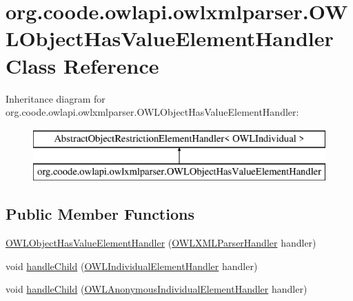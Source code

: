 \hypertarget{classorg_1_1coode_1_1owlapi_1_1owlxmlparser_1_1_o_w_l_object_has_value_element_handler}{\section{org.\-coode.\-owlapi.\-owlxmlparser.\-O\-W\-L\-Object\-Has\-Value\-Element\-Handler Class Reference}
\label{classorg_1_1coode_1_1owlapi_1_1owlxmlparser_1_1_o_w_l_object_has_value_element_handler}
}
Inheritance diagram for org.\-coode.\-owlapi.\-owlxmlparser.\-O\-W\-L\-Object\-Has\-Value\-Element\-Handler\-:\begin{figure}[H]
\begin{center}
\leavevmode
\includegraphics[height=2.000000cm]{classorg_1_1coode_1_1owlapi_1_1owlxmlparser_1_1_o_w_l_object_has_value_element_handler}
\end{center}
\end{figure}
\subsection*{Public Member Functions}
\begin{DoxyCompactItemize}
\item 
\hyperlink{classorg_1_1coode_1_1owlapi_1_1owlxmlparser_1_1_o_w_l_object_has_value_element_handler_ac637e8775b49bdc0d0437339fa5f76ab}{O\-W\-L\-Object\-Has\-Value\-Element\-Handler} (\hyperlink{classorg_1_1coode_1_1owlapi_1_1owlxmlparser_1_1_o_w_l_x_m_l_parser_handler}{O\-W\-L\-X\-M\-L\-Parser\-Handler} handler)
\item 
void \hyperlink{classorg_1_1coode_1_1owlapi_1_1owlxmlparser_1_1_o_w_l_object_has_value_element_handler_a5aaa1bacb7c3083c89271b36bfc2de14}{handle\-Child} (\hyperlink{classorg_1_1coode_1_1owlapi_1_1owlxmlparser_1_1_o_w_l_individual_element_handler}{O\-W\-L\-Individual\-Element\-Handler} handler)
\item 
void \hyperlink{classorg_1_1coode_1_1owlapi_1_1owlxmlparser_1_1_o_w_l_object_has_value_element_handler_a0c2a7145a8557d989e9e3d083e923a2b}{handle\-Child} (\hyperlink{classorg_1_1coode_1_1owlapi_1_1owlxmlparser_1_1_o_w_l_anonymous_individual_element_handler}{O\-W\-L\-Anonymous\-Individual\-Element\-Handler} handler)
\end{DoxyCompactItemize}
